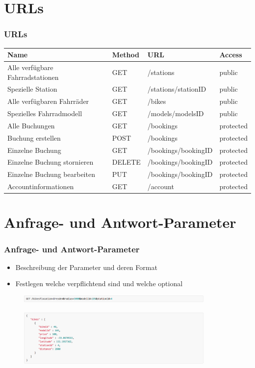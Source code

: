 \section{URLs}
\begin{frame}
	\frametitle*{URLs}
	\begin{tabularx}{\columnwidth}{|X|p{1cm}|p{2.5cm}|p{1.5cm}|}
		\hline
		Name & Method & URL & Access \\
		\hline
		\hline
		Alle verfügbare Fahrradstationen & GET & /stations & public \\
		\hline
		Spezielle Station & GET & /stations/stationID & public \\
		\hline
		Alle verfügbaren Fahrräder & GET & /bikes & public \\
		\hline
		Spezielles Fahrradmodell & GET & /models/modelsID & public \\
		\hline
		Alle Buchungen & GET & /bookings & protected \\
		\hline
		Buchung erstellen & POST & /bookings & protected \\
		\hline
		Einzelne Buchung & GET & /bookings/bookingID & protected \\
		\hline
		Einzelne Buchung stornieren & DELETE & /bookings/bookingID & protected \\
		\hline
		Einzelne Buchung bearbeiten & PUT & /bookings/bookingID & protected \\
		\hline
		Accountinformationen & GET & /account & protected \\
		\hline
	\end{tabularx}
\end{frame}

\section{Anfrage- und Antwort-Parameter}
\begin{frame}
	\frametitle*{Anfrage- und Antwort-Parameter}
	\begin{itemize}
		\item Beschreibung der Parameter und deren Format
		\item Festlegen welche verpflichtend sind und welche optional
	\end{itemize}
	\begin{figure}
		\centering
		\includegraphics[height=4mm]{pics/request_example.png}
	\end{figure}
	\begin{figure}
		\centering
		\includegraphics[height=28mm]{pics/response_example.png}
	\end{figure}
\end{frame}

